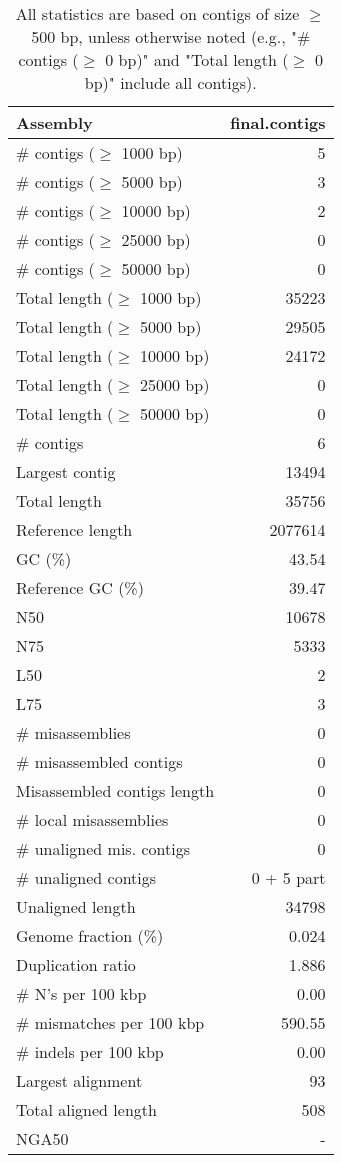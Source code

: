 \documentclass[12pt,a4paper]{article}
\begin{document}
\begin{table}[ht]
\begin{center}
\caption{All statistics are based on contigs of size $\geq$ 500 bp, unless otherwise noted (e.g., "\# contigs ($\geq$ 0 bp)" and "Total length ($\geq$ 0 bp)" include all contigs).}
\begin{tabular}{|l*{1}{|r}|}
\hline
Assembly & final.contigs \\ \hline
\# contigs ($\geq$ 1000 bp) & 5 \\ \hline
\# contigs ($\geq$ 5000 bp) & 3 \\ \hline
\# contigs ($\geq$ 10000 bp) & 2 \\ \hline
\# contigs ($\geq$ 25000 bp) & 0 \\ \hline
\# contigs ($\geq$ 50000 bp) & 0 \\ \hline
Total length ($\geq$ 1000 bp) & 35223 \\ \hline
Total length ($\geq$ 5000 bp) & 29505 \\ \hline
Total length ($\geq$ 10000 bp) & 24172 \\ \hline
Total length ($\geq$ 25000 bp) & 0 \\ \hline
Total length ($\geq$ 50000 bp) & 0 \\ \hline
\# contigs & 6 \\ \hline
Largest contig & 13494 \\ \hline
Total length & 35756 \\ \hline
Reference length & 2077614 \\ \hline
GC (\%) & 43.54 \\ \hline
Reference GC (\%) & 39.47 \\ \hline
N50 & 10678 \\ \hline
N75 & 5333 \\ \hline
L50 & 2 \\ \hline
L75 & 3 \\ \hline
\# misassemblies & 0 \\ \hline
\# misassembled contigs & 0 \\ \hline
Misassembled contigs length & 0 \\ \hline
\# local misassemblies & 0 \\ \hline
\# unaligned mis. contigs & 0 \\ \hline
\# unaligned contigs & 0 + 5 part \\ \hline
Unaligned length & 34798 \\ \hline
Genome fraction (\%) & 0.024 \\ \hline
Duplication ratio & 1.886 \\ \hline
\# N's per 100 kbp & 0.00 \\ \hline
\# mismatches per 100 kbp & 590.55 \\ \hline
\# indels per 100 kbp & 0.00 \\ \hline
Largest alignment & 93 \\ \hline
Total aligned length & 508 \\ \hline
NGA50 & - \\ \hline
\end{tabular}
\end{center}
\end{table}
\end{document}
